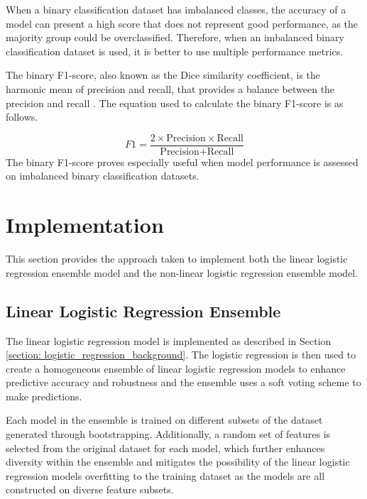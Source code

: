 \documentclass[10pt, conference]{IEEEtran}
\begin{document}
When a binary classification dataset has imbalanced classes, the accuracy of a model can present a high score that does not
represent good performance, as the majority group could be overclassified. Therefore, when an imbalanced binary classification
dataset is used, it is better to use multiple performance metrics.

The binary F1-score, also known as the Dice
similarity coefficient, is the harmonic mean of precision and recall, that provides a balance between the
precision and recall \cite{F1-score_ref}.
The equation used to calculate the binary F1-score is as follows.

\begin{equation}
    F1 = \frac{2 \times \text{Precision} \times \text{Recall}}{\text{Precision} + \text{Recall}} \label{F1}
\end{equation}
The binary F1-score proves especially useful when model performance is assessed on imbalanced binary classification
datasets.

\section{Implementation} \label{section: Implementation}

This section provides the approach taken to implement both the linear logistic regression
ensemble model and the non-linear logistic regression ensemble model.

\subsection{Linear Logistic Regression Ensemble} \label{section: LLRE}

The linear logistic regression model is implemented as described in Section \ref{section: logistic_regression_background}.
The logistic regression is then used to create a homogeneous ensemble of linear logistic regression models to enhance
predictive accuracy and robustness and the ensemble uses a soft voting scheme to make predictions.

Each model in the ensemble is trained on different subsets of the dataset generated
through bootstrapping. Additionally, a random set of features is selected from the
original dataset for each model, which further enhances diversity within the ensemble and mitigates the possibility of the
linear logistic regression models overfitting to the training dataset as the models are all constructed on diverse feature subsets.
\end{document}

